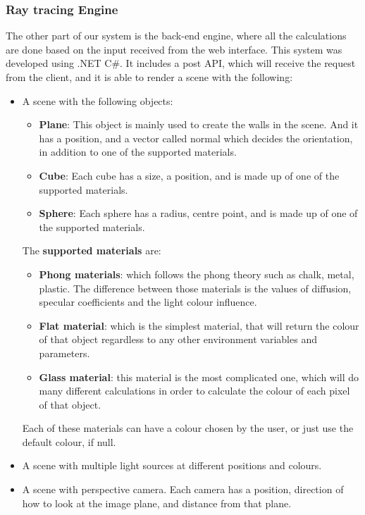 \documentclass{article}
\begin{document}
	\subsubsection{Ray tracing Engine}
	The other part of our system is the back-end engine, where all the calculations are done based on the input received from the web interface. This system was developed using .NET C\#. It includes a post API, which will receive the request from the client, and it is able to render a scene with the following:
	\begin{itemize}
		\item A scene with the following objects:
		\begin{itemize}
			\item \textbf{Plane}: This object is mainly used to create the walls in the scene. And it has a position, and a vector called normal which decides the orientation, in addition to one of the supported materials.
			\item \textbf{Cube}: Each cube has a size, a position, and is made up of one of the supported materials.
			\item \textbf{Sphere}: Each sphere has a radius, centre point, and is made up of one of the supported materials.
		\end{itemize}
		The  \textbf{supported materials} are:
		\begin{itemize}
			\item \textbf{Phong materials}:  which follows the phong theory such as chalk, metal, plastic. The difference between those materials is the values of diffusion, specular coefficients and the light colour influence.
			\item \textbf{Flat material}: which is the simplest material, that will return the colour of that object regardless to any other environment variables and parameters.
			\item \textbf {Glass material}: this material is the most complicated one, which will do many different calculations in order to calculate the colour of each pixel of that object.
		\end{itemize}
		Each of these materials can have a colour chosen by the user, or just use the default colour, if null.
		\item A scene with multiple light sources at different positions and colours.
		\item A scene with perspective camera. Each camera has a position, direction of how to look at the image plane, and distance from that plane.
	\end{itemize}
\end{document}
